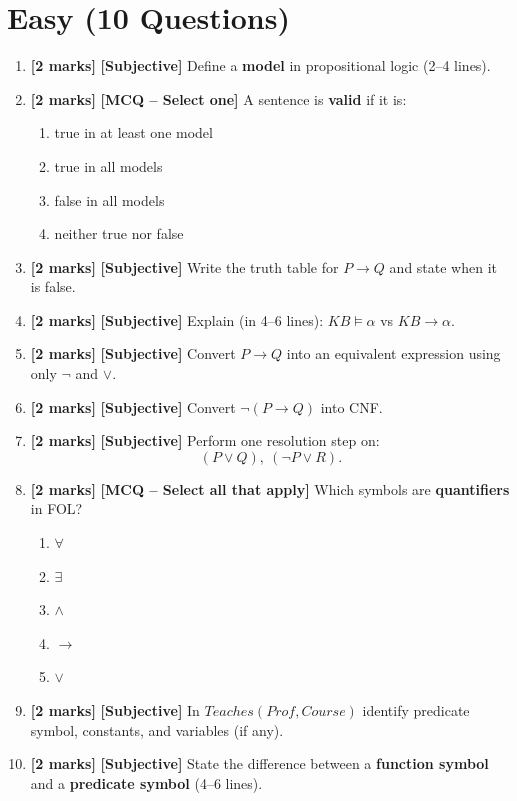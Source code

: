\documentclass[11pt,a4paper]{article}
\newcommand{\EMarks}{\textbf{[2 marks]} }
\begin{document}
\vspace{0.6em}

\section*{Easy (10 Questions)}
\begin{enumerate}[label=\textbf{E\arabic*.}, leftmargin=*]
  \item \EMarks \textbf{[Subjective]} Define a \textbf{model} in propositional logic (2--4 lines).

  \item \EMarks \textbf{[MCQ -- Select one]} A sentence is \textbf{valid} if it is:
    \begin{enumerate}[label=(\Alph*), leftmargin=*]
      \item true in at least one model
      \item true in all models
      \item false in all models
      \item neither true nor false
    \end{enumerate}

  \item \EMarks \textbf{[Subjective]} Write the truth table for $P \rightarrow Q$ and state when it is false.

  \item \EMarks \textbf{[Subjective]} Explain (in 4--6 lines): $KB \models \alpha$ vs $KB \rightarrow \alpha$.

  \item \EMarks \textbf{[Subjective]} Convert $P \rightarrow Q$ into an equivalent expression using only $\lnot$ and $\lor$.

  \item \EMarks \textbf{[Subjective]} Convert $\lnot(P \rightarrow Q)$ into CNF.

  \item \EMarks \textbf{[Subjective]} Perform one resolution step on:
    \[
      (P \lor Q),\ (\lnot P \lor R).
    \]

  \item \EMarks \textbf{[MCQ -- Select all that apply]} Which symbols are \textbf{quantifiers} in FOL?
    \begin{enumerate}[label=(\Alph*), leftmargin=*]
      \item $\forall$
      \item $\exists$
      \item $\land$
      \item $\rightarrow$
      \item $\lor$
    \end{enumerate}

  \item \EMarks \textbf{[Subjective]} In $Teaches(Prof, Course)$ identify predicate symbol, constants, and variables (if any).

  \item \EMarks \textbf{[Subjective]} State the difference between a \textbf{function symbol} and a \textbf{predicate symbol} (4--6 lines).
\end{enumerate}
\end{document}
